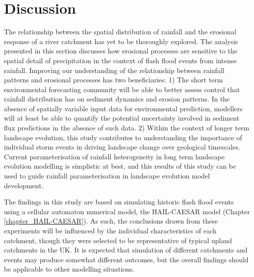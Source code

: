 \section{Discussion}

The relationship between the spatial distribution of rainfall and the erosional response of a river catchment has yet to be thoroughly explored. The analysis presented in this section discusses how erosional processes are sensitive to the spatial detail of precipitation in the context of flash flood events from intense rainfall. Improving our understanding of the relationship between rainfall patterns and erosional processes has two beneficiaries: 1) The short term environmental forecasting community will be able to better assess control that  rainfall distribution has on sediment dynamics and erosion patterns. In the absence of spatially variable input data for environmental prediction, modellers will at least be able to quantify the potential uncertainty involved in sediment flux predictions in the absence of such data. 2) Within the context of longer term landscape evolution, this study contributes to understanding the importance of individual storm events in driving landscape change over geological timescales. Current parameterisation of rainfall heterogeneity in long term landscape evolution modelling is simplistic at best, and this results of this study can be used to guide rainfall parameterisation in landscape evolution model development. 

The findings in this study are based on simulating historic flash flood events using a cellular automaton  numerical model, the HAIL-CAESAR model (Chapter \ref{chapter_HAIL-CAESAR}). As such, the conclusions drawn from these experiments will be influenced by the individual characteristics of each catchment, though they were selected to be representative of typical upland catchments in the UK. It is expected that simulation of different catchments and events may produce somewhat different outcomes, but the overall findings should be applicable to other modelling situations. 

